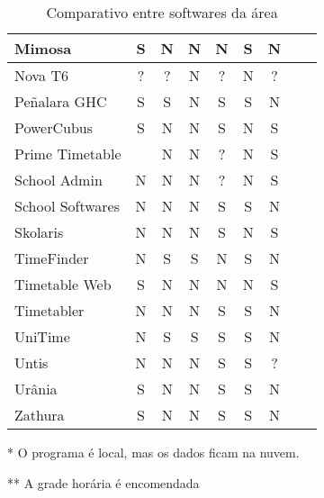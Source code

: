 \documentclass[12pt,a4paper]{article}
\begin{document}
\begin{table}[htb]
\begin{center}
{\begin{threeparttable}
\begin{tabular}{| l | c | c | c | c | c | c | c | c | }
							Mimosa				& S & N & N & N & S & N & \cite{rel_mimosa}								\\ \hline %
							Nova T6             & ? & ? & N & ? & N & ? & \cite{rel_novat6}								\\ \hline %
							Peñalara GHC		& S & S & N & S & S & N & \cite{rel_penalara}							\\ \hline %
							PowerCubus 	    	& S & N & N & S & N & S & \cite{rel_gridclass, rel_powercubus}			\\ \hline %
							Prime Timetable     &   & N & N & ? & N & S & \cite{rel_primetimetable}						\\ \hline %
							School Admin		& N & N & N & ? & N & S & \cite{rel_schooladmin}						\\ \hline %
							School Softwares    & N & N & N & S & S & N & \cite{rel_schoolsoftwares} 					\\ \hline %
							Skolaris			& N & N & N & S & N & S & \cite{rel_skolaris}							\\ \hline %
							TimeFinder          & N & S & S & N & S & N & \cite{rel_timefinder}							\\ \hline %
							Timetable Web 	    & S & N & N & N & N & S & \cite{rel_timetableweb} 						\\ \hline %
							Timetabler          & N & N & N & S & S & N & \cite{rel_timetabler} 						\\ \hline %
							UniTime  			& N & S & S & S & S & N & \cite{rel_unitime}  							\\ \hline %
							Untis 	 			& N & N & N & S & S & ? & \cite{rel_untis} 								\\ \hline %
							Urânia 		   	 	& S & N & N & S & S & N & \cite{rel_urania} 							\\ \hline %
							Zathura				& S & N & N & S & S & N & \cite{rel_zathura}							\\ \hline %
						\end{tabular}
						\caption{Comparativo entre softwares da área}
						\label{table:softwares}
						\footnotesize
						\begin{tablenotes}
							\item[*]{ O programa é local, mas os dados ficam na nuvem.}
							\item[**]{A grade horária é encomendada}
						\end{tablenotes}
					\end{threeparttable}
				}
			\end{center}
		\end{table}
\end{document}
